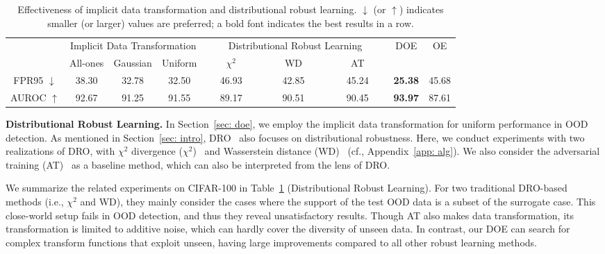 \documentclass{article} \usepackage{iclr2022_conference,times}
\begin{document}
\begin{table}[]
\small
\centering
\caption{Effectiveness of implicit data transformation and distributional robust learning. $\downarrow$ (or $\uparrow$) indicates smaller (or larger) values are preferred; a bold font indicates the best results in a row.  } \label{tab: aba}
\begin{tabular}{c|ccc|ccc|cc}
\toprule[1.5pt]
      & \multicolumn{3}{c}{Implicit Data Transformation} & \multicolumn{3}{|c|}{Distributional Robust Learning} & \multirow{2}{*}{DOE} & \multirow{2}{*}{OE} \\
      \cline{2-7}
      & All-ones        & Gaussian       & Uniform       & ~~~~$\chi^2$~~~~          & ~~~~WD~~~~             & ~~~~AT~~~~            &                      &                     \\
 \midrule[1pt]
FPR95 $\downarrow$ & 38.30           & 32.78          & 32.50         & 46.93             & 42.85          & 45.24         & \textbf{25.38}                & 45.68               \\
AUROC $\uparrow$ & 92.67           & 91.25          & 91.55         & 89.17             & 90.51          & 90.45         & \textbf{93.97}                & 87.61               \\
\bottomrule[1.5pt]
\end{tabular}
\end{table}




\textbf{Distributional Robust Learning.} In Section~\ref{sec: doe}, we employ the implicit data transformation for uniform performance in OOD detection. As mentioned in Section~\ref{sec: intro}, DRO~\citep{rahimian2019distributionally} also focuses on distributional robustness. Here, we conduct experiments with two realizations of DRO, with $\chi^2$ divergence ($\chi^2$)~\citep{hashimoto2018fairness} and Wasserstein distance (WD)~\citep{KwonKWP20} (cf., Appendix~\ref{app: alg}). We also consider the adversarial training (AT)~\citep{madry2017towards} as a baseline method, which can also be interpreted from the lens of DRO.





We summarize the related experiments on CIFAR-100 in Table~\ref{tab: aba} (Distributional Robust Learning). For two traditional DRO-based methods (i.e., $\chi^2$ and WD), they mainly consider the cases where the support of the test OOD data is a subset of the surrogate case. This close-world setup fails in OOD detection, and thus they reveal unsatisfactory results. Though AT also makes data transformation, its transformation is limited to additive noise, which can hardly cover the diversity of unseen data. In contrast, our DOE can search for complex transform functions that exploit unseen, having large improvements compared to all other robust learning methods. 
\end{document}
